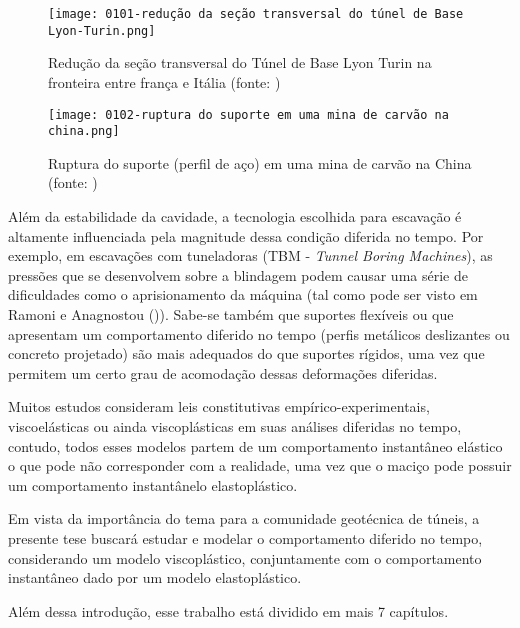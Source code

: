 \begin{figure}[H]
	\begin{center}
		\texttt{[image: 0101-redução da seção transversal do túnel de Base Lyon-Turin.png]}
	\end{center}
	\caption{\label{redução_base_turin}Redução da seção transversal do Túnel de Base Lyon Turin na fronteira entre frança e Itália (fonte: )}
\end{figure}

\begin{figure}[H]
	\begin{center}
		\texttt{[image: 0102-ruptura do suporte em uma mina de carvão na china.png]}
	\end{center}
	\caption{\label{redução_base_turin}Ruptura do suporte (perfil de aço) em uma mina de carvão na China (fonte: )}
\end{figure}
 
Além da estabilidade da cavidade, a tecnologia escolhida para escavação é altamente influenciada pela magnitude dessa condição diferida no tempo. Por exemplo, em escavações com tuneladoras (TBM - \textit{Tunnel Boring Machines}), as pressões que se desenvolvem sobre a blindagem podem causar uma série de dificuldades como o aprisionamento da máquina (tal como pode ser visto em Ramoni e Anagnostou (\citeyear{Ramoni2010a,Ramoni2010b})). Sabe-se também que suportes flexíveis ou que apresentam um comportamento diferido no tempo (perfis metálicos deslizantes ou concreto projetado) são mais adequados do que suportes rígidos, uma vez que permitem um certo grau de acomodação dessas deformações diferidas.

Muitos estudos consideram leis constitutivas empírico-experimentais, viscoelásticas ou ainda viscoplásticas em suas análises diferidas no tempo, contudo, todos esses modelos partem de um comportamento instantâneo elástico o que pode não corresponder com a realidade, uma vez que o maciço pode possuir um comportamento instantânelo elastoplástico.

Em vista da importância do tema para a comunidade geotécnica de túneis, a presente tese buscará estudar e modelar o comportamento diferido no tempo, considerando um modelo viscoplástico, conjuntamente com o comportamento instantâneo dado por um modelo elastoplástico. 

Além dessa introdução, esse trabalho está dividido em mais 7 capítulos.

